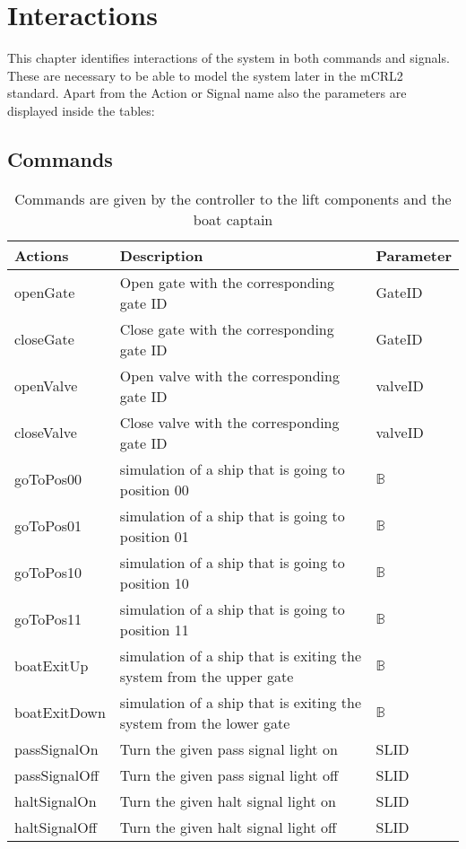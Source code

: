 \section{Interactions}
This chapter identifies interactions of the system in both commands and signals. These are necessary to be able to model the system later in the mCRL2 standard. Apart from the Action or Signal name also the parameters are displayed inside the tables:

\subsection{Commands}
\begin{table}[htbp]
	\centering
	\begin{tabular}{lll}
		\toprule
		\textbf{Actions} & \textbf{Description} & \textbf{Parameter} \\
		\midrule
		openGate & Open gate with the corresponding gate ID & GateID \\
		closeGate & Close gate with the corresponding gate ID & GateID \\
		openValve & Open valve with the corresponding gate ID & valveID \\
		closeValve & Close valve with the corresponding gate ID & valveID \\
		goToPos00  & simulation of a ship that is going to position 00 & $ \mathbb{B} $ \\
		goToPos01  & simulation of a ship that is going to position 01 & $ \mathbb{B} $ \\
		goToPos10  & simulation of a ship that is going to position 10 & $ \mathbb{B} $ \\
		goToPos11  & simulation of a ship that is going to position 11 & $ \mathbb{B} $ \\
		boatExitUp  & simulation of a ship that is exiting the system from the upper gate & $ \mathbb{B} $ \\
		boatExitDown  & simulation of a ship that is exiting the system from the lower gate & $ \mathbb{B} $ \\
		passSignalOn & Turn the given pass signal light on & SLID\\
		passSignalOff & Turn the given pass signal light off & SLID\\
		haltSignalOn & Turn the given halt signal light on & SLID\\
		haltSignalOff & Turn the given halt signal light off & SLID\\
		
		\bottomrule
	\end{tabular}%
	\label{tab:addlabel}%
	\caption{Commands are given by the controller to the lift components and the boat captain}
\end{table}%





